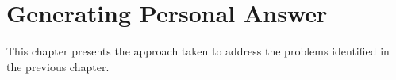 \chapter{Generating Personal Answer}
\label{chap:methods}
This chapter presents the approach taken to address the problems identified in the previous chapter.







